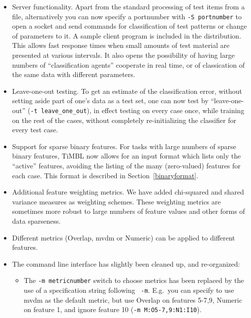 \documentclass{report}
\begin{document}
\begin{itemize}

\item Server functionality. Apart from the standard processing of test
items from a file, alternatively you can now specify a portnumber with
{\tt -S portnumber} to open a socket and send commands for
classification of test patterns or change of parameters to it. A
sample client program is included in the distribution. This allows
fast response times when small amounts of test material are presented
at various intervals. It also opens the possibility of having large
numbers of ``classification agents'' cooperate in real time, or of
classication of the same data with different parameters.

\item Leave-one-out testing. To get an estimate of the classification
error, without setting aside part of one's data as a test set, one
can now test by ``leave-one-out'' ({\tt -t leave\_one\_out}), in effect
testing on every case once, while training on the rest of the cases,
without completely re-initializing the classifier for every test case.

\item Support for sparse binary features. For tasks with large numbers
of sparse binary features, TiMBL now allows for an input format which
lists only the ``active'' features, avoiding the listing of the many
(zero-valued) features for each case. This format is described in
Section~\ref{binaryformat}.

\item Additional feature weighting metrics. We have added chi-squared
and shared variance measures as weighting schemes. These weighting
metrics are sometimes more robust to large numbers of feature values
and other forms of data sparseness.

\item Different metrics (Overlap, {\sc mvdm} or Numeric) can be
applied to different features.

\item The command line interface has slightly been cleaned up, and
re-organized:

\begin{itemize}

\item The {\tt -m metricnumber} switch to choose metrics has been
replaced by the use of a specification string following {\tt
-m}. E.g.~you can specify to use {\sc mvdm} as the default metric, but
use Overlap on features 5-7,9, Numeric on feature 1, and ignore
feature 10 ({\tt -m M:O5-7,9:N1:I10}).


\end{itemize}
\end{itemize}
\end{document}
